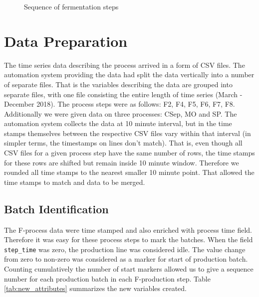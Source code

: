 \documentclass{article}
\begin{document}
\begin{figure}[ht]
    \centering
    \caption{Sequence of fermentation steps}
    \label{fig:process_steps}
\end{figure}


\section{Data Preparation}
The time series data describing the process arrived in a form of CSV files. The automation system providing the data had split the data vertically into a number of separate files. That is the variables describing the data are grouped into separate files, with one file consisting the entire length of time series (March - December 2018). The process steps were as follows: F2, F4, F5, F6, F7, F8. Additionally we were given data on three processes: CSep, MO and SP. The automation system collects the data at 10 minute interval, but in the time stamps themselves between the respective CSV files vary within that interval (in simpler terms, the timestamps on lines don't match). That is, even though all CSV files for a given process step have the same number of rows, the time stamps for these rows are shifted but remain inside 10 minute window. Therefore we rounded all time stamps to the nearest smaller 10 minute point. That allowed the time stamps to match and data to be merged.

\subsection{Batch Identification}
The F-process data were time stamped and also enriched with process time field. Therefore it was easy for these process steps to mark the batches. When the field \texttt{step\_time} was zero, the production line was considered idle. The value change from zero to non-zero was considered as a marker for start of production batch. Counting cumulatively the number of start markers allowed us to give a sequence number for each production batch in each F-production step. Table \ref{tab:new_attributes} summarizes the new variables created.
\end{document}
